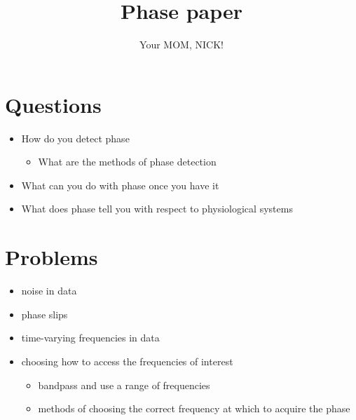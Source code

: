 \documentclass{article}
\title{Phase paper}
\author{Your MOM, NICK!}
\date{}
\begin{document}
\maketitle

\section{Questions}

\begin{itemize}
\item How do you detect phase
\begin{itemize}
\item What are the methods of phase detection
\end{itemize}
\item What can you do with phase once you have it
\item What does phase tell you with respect to physiological systems
\end{itemize}

\section{Problems}

\begin{itemize}
\item noise in data
\item phase slips
\item time-varying frequencies in data
\item choosing how to access the frequencies of interest
\begin{itemize}
\item bandpass and use a range of frequencies
\item methods of choosing the correct frequency at which to acquire the phase
\end{itemize}
\end{itemize}
\end{document}
